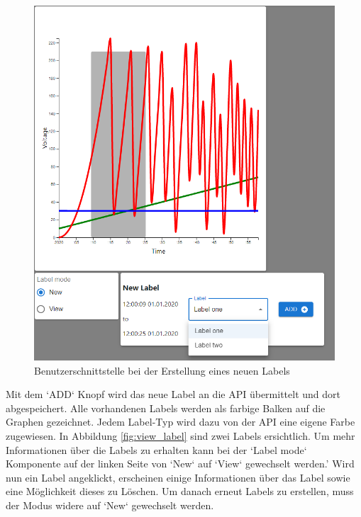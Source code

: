 \begin{figure}[H]
    \centering
    \includegraphics[width=1.0\textwidth]{gfx/newLabel}
    \caption{Benutzerschnittstelle bei der Erstellung eines neuen Labels}
    \label{fig:add_label}
\end{figure}
Mit dem `ADD` Knopf wird das neue Label an die \ac{API} übermittelt und dort abgespeichert.
Alle vorhandenen Labels werden als farbige Balken auf die Graphen gezeichnet.
Jedem Label-Typ wird dazu von der \ac{API} eine eigene Farbe zugewiesen.
In Abbildung \ref{fig:view_label} sind zwei Labels ersichtlich.
Um mehr Informationen über die Labels zu erhalten kann bei der `Label mode` Komponente auf der linken Seite von
`New` auf `View` gewechselt werden.' Wird nun ein Label angeklickt,
erscheinen einige Informationen über das Label sowie eine Möglichkeit dieses zu Löschen.
Um danach erneut Labels zu erstellen, muss der Modus widere auf `New` gewechselt werden.



